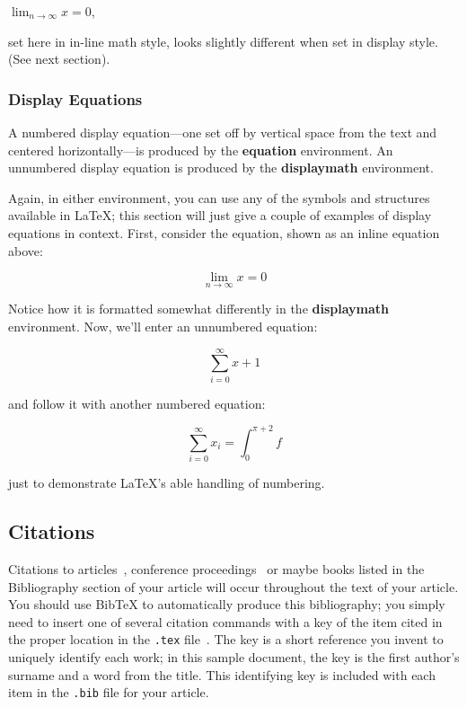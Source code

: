 \documentclass[sigconf]{acmart}
\begin{document}
\begin{math}
  \lim_{n\rightarrow \infty}x=0
\end{math},

set here in in-line math style, looks slightly different when
set in display style.  (See next section).

\subsubsection{Display Equations}

A numbered display equation---one set off by vertical space from the
text and centered horizontally---is produced by the \textbf{equation}
environment. An unnumbered display equation is produced by the
\textbf{displaymath} environment.

Again, in either environment, you can use any of the symbols
and structures available in \LaTeX\@; this section will just
give a couple of examples of display equations in context.
First, consider the equation, shown as an inline equation above:

\begin{equation}
  \lim_{n\rightarrow \infty}x=0
\end{equation}

Notice how it is formatted somewhat differently in
the \textbf{displaymath}
environment.  Now, we'll enter an unnumbered equation:

\begin{displaymath}
  \sum_{i=0}^{\infty} x + 1
\end{displaymath}

and follow it with another numbered equation:

\begin{equation}
  \sum_{i=0}^{\infty}x_i=\int_{0}^{\pi+2} f
\end{equation}

just to demonstrate \LaTeX's able handling of numbering.

\subsection{Citations}

Citations to articles~\cite{bowman:reasoning, clark:pct, braams:babel,
  herlihy:methodology}, conference proceedings~\cite{clark:pct} or
maybe books \cite{Lamport:LaTeX, salas:calculus} listed in the
Bibliography section of your article will occur throughout the text of
your article.  You should use BibTeX to automatically produce this
bibliography; you simply need to insert one of several citation
commands with a key of the item cited in the proper location in the
\texttt{.tex} file~\cite{Lamport:LaTeX}.  The key is a short reference
you invent to uniquely identify each work; in this sample document,
the key is the first author's surname and a word from the title.  This
identifying key is included with each item in the \texttt{.bib} file
for your article.
\end{document}
